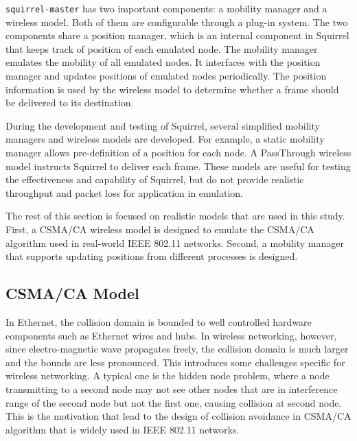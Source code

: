 \documentclass[12pt]{report}
\begin{document}
\texttt{squirrel-master} has two important components: a mobility manager and a wireless model. Both of them are configurable through a plug-in system. The two components share a position manager, which is an internal component in Squirrel that keeps track of position of each emulated node. The mobility manager emulates the mobility of all emulated nodes. It interfaces with the position manager and updates positions of emulated nodes periodically. The position information is used by the wireless model to determine whether a frame should be delivered to its destination.

During the development and testing of Squirrel, several simplified mobility managers and wireless models are developed. For example, a static mobility manager allows pre-definition of a position for each node. A PassThrough wireless model instructs Squirrel to deliver each frame. These models are useful for testing the effectiveness and capability of Squirrel, but do not provide realistic throughput and packet loss for application in emulation.

The rest of this section is focused on realistic models that are used in this study. First, a CSMA/CA wireless model is designed to emulate the CSMA/CA algorithm used in real-world IEEE 802.11 networks. Second, a mobility manager that supports updating positions from different processes is designed.

\subsection{CSMA/CA Model}
\label{sec:squirrel_csmaca}

In Ethernet, the collision domain is bounded to well controlled hardware components such as Ethernet wires and hubs. In wireless networking, however, since electro-magnetic wave propagates freely, the collision domain is much larger and the bounds are less pronounced. This introduces some challenges specific for wireless networking. A typical one is the hidden node problem, where a node transmitting to a second node may not see other nodes that are in interference range of the second node but not the first one, causing collision at second node. This is the motivation that lead to the design of collision avoidance in CSMA/CA algorithm that is widely used in IEEE 802.11 networks.
\end{document}
